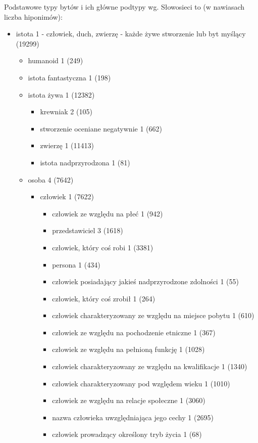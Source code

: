 \documentclass[a4paper,12pt]{article}
\begin{document}
Podstawowe typy bytów i ich główne podtypy wg. Słowosieci to (w nawiasach liczba hiponimów):
\begin{itemize}
\item istota 1 - człowiek, duch, zwierzę - każde żywe stworzenie lub byt myślący (19299)
  \begin{itemize}
  \item humanoid 1 (249)
  \item istota fantastyczna 1 (198)
  \item istota żywa 1 (12382)
    \begin{itemize}
    \item krewniak 2 (105)
    \item stworzenie oceniane negatywnie 1 (662)
    \item zwierzę 1 (11413)
    \item istota nadprzyrodzona 1 (81)
    \end{itemize}
  \item osoba 4 (7642)
    \begin{itemize}
    \item człowiek 1 (7622)
      \begin{itemize}
      \item człowiek ze względu na płeć 1  (942)
      \item przedstawiciel 3  (1618)
      \item człowiek, który coś robi 1  (3381)
      \item persona 1  (434)
      \item człowiek posiadający jakieś nadprzyrodzone zdolności 1 (55)
      \item człowiek, który coś zrobił 1  (264)
      \item człowiek charakteryzowany ze względu na miejsce pobytu 1  (610)
      \item człowiek ze względu na pochodzenie etniczne 1  (367)
      \item człowiek ze względu na pełnioną funkcję 1  (1028)
      \item człowiek charakteryzowany ze względu na kwalifikacje 1  (1340)
      \item człowiek charakteryzowany pod względem wieku 1  (1010)
      \item człowiek ze względu na relacje społeczne 1  (3060)
      \item nazwa człowieka uwzględniająca jego cechy 1  (2695)
      \item człowiek prowadzący określony tryb życia 1  (68)
      \end{itemize}

\end{itemize}
\end{itemize}
\end{itemize}
\end{document}
